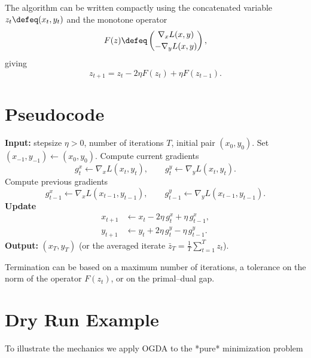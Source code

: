 \documentclass{article}
\begin{document}
The algorithm can be written compactly using the concatenated variable
\(z_t\defeq (x_t,y_t)\) and the monotone operator
\[
F(z)\defeq\begin{pmatrix}
\nabla_{x}L(x,y)\\[2pt]
-\nabla_{y}L(x,y)
\end{pmatrix},
\]
giving
\[
z_{t+1}=z_{t}-2\eta F(z_{t})+\eta F(z_{t-1}). \tag{1}
\]

\section{Pseudocode}
\begin{algorithm}[H]
\caption{Optimistic Gradient Descent–Ascent (OGDA)}\label{alg:ogda}
\begin{algorithmic}[1]
\STATE \textbf{Input:} stepsize \(\eta>0\), number of iterations \(T\), initial pair \((x_{0},y_{0})\).
\STATE Set \((x_{-1},y_{-1})\leftarrow (x_{0},y_{0})\).
    \STATE Compute current gradients 
    \[
    g^{x}_{t}\leftarrow \nabla_{x}L(x_{t},y_{t}),\qquad 
    g^{y}_{t}\leftarrow \nabla_{y}L(x_{t},y_{t}).
    \]
    \STATE Compute previous gradients 
    \[
    g^{x}_{t-1}\leftarrow \nabla_{x}L(x_{t-1},y_{t-1}),\qquad 
    g^{y}_{t-1}\leftarrow \nabla_{y}L(x_{t-1},y_{t-1}).
    \]
    \STATE \textbf{Update}
    \[
    \begin{aligned}
    x_{t+1}&\gets x_{t}-2\eta\, g^{x}_{t}+\eta\, g^{x}_{t-1},\\
    y_{t+1}&\gets y_{t}+2\eta\, g^{y}_{t}-\eta\, g^{y}_{t-1}.
    \end{aligned}
    \]
\ENDFOR
\STATE \textbf{Output:} \((x_{T},y_{T})\) (or the averaged iterate \(\bar z_T=\frac1T\sum_{t=1}^{T}z_t\)).
\end{algorithmic}
\end{algorithm}

Termination can be based on a maximum number of iterations, a tolerance on the norm of the operator \(F(z_t)\), or on the primal–dual gap.

\section{Dry Run Example}
To illustrate the mechanics we apply OGDA to the *pure* minimization problem  
\end{document}
